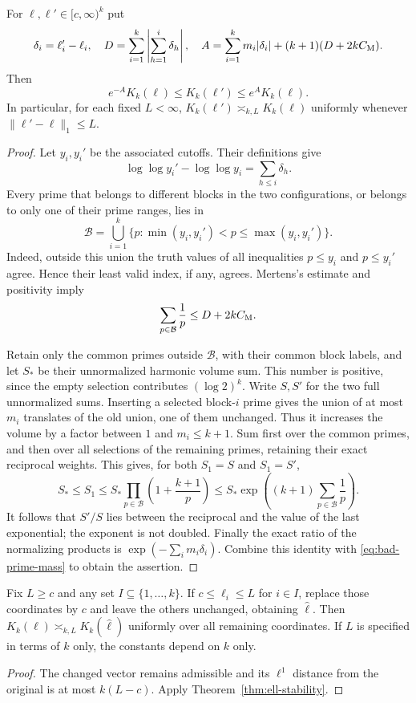 \begin{theorem}\label{thm:ell-stability}
For $\ell,\ell'\in[c,\infty)^k$ put
\[
 \delta_i=\ell'_i-\ell_i,\quad
 D=\sum_{i=1}^k\left|\sum_{h=1}^i\delta_h\right|,
 \quad
 A=\sum_{i=1}^km_i|\delta_i|+(k+1)(D+2kC_{\rm M}).
\]
Then
\[
 e^{-A}K_k(\ell)\le K_k(\ell')\le e^A K_k(\ell).
\]
In particular, for each fixed $L<\infty$,
$K_k(\ell')\asymp_{k,L}K_k(\ell)$ uniformly whenever
$\|\ell'-\ell\|_1\le L$.
\end{theorem}
\begin{proof}
Let $y_i,y_i'$ be the associated cutoffs. Their definitions give
\[
 \log\log y_i'-\log\log y_i=\sum_{h\le i}\delta_h.
\]
Every prime that belongs to different blocks in the two configurations,
or belongs to only one of their prime ranges, lies in
\[
 \mathcal B=\bigcup_{i=1}^k
  \{p:\min(y_i,y_i')<p\le\max(y_i,y_i')\}.
\]
Indeed, outside this union the truth values of all inequalities
$p\le y_i$ and $p\le y_i'$ agree. Hence their least valid index,
if any, agrees. Mertens's estimate and positivity imply
\begin{equation}\label{eq:bad-prime-mass}
 \sum_{p\in\mathcal B}\frac1p\le D+2kC_{\rm M}.
\end{equation}

Retain only the common primes outside $\mathcal B$, with their common
block labels, and let $S_*$ be their unnormalized harmonic volume sum.
This number is positive, since the empty selection contributes
$(\log2)^k$. Write $S,S'$ for the two full unnormalized sums.
Inserting a selected block-$i$ prime gives the union of at most $m_i$
translates of the old union, one of them unchanged. Thus it increases
the volume by a factor between $1$ and $m_i\le k+1$.
Sum first over the common primes, and then over all selections of
the remaining primes, retaining their exact reciprocal weights. This
gives, for both $S_1=S$ and $S_1=S'$,
\[
 S_*\le S_1\le
 S_*\prod_{p\in\mathcal B}\left(1+\frac{k+1}{p}\right)
 \le S_*\exp\left((k+1)\sum_{p\in\mathcal B}\frac1p\right).
\]
It follows that $S'/S$ lies between the reciprocal and the value of
the last exponential; the exponent is not doubled. Finally the exact
ratio of the normalizing products is
$\exp(-\sum_i m_i\delta_i)$. Combine this identity with
\eqref{eq:bad-prime-mass} to obtain the assertion.
\end{proof}

\begin{corollary}
\label{cor:bounded-blocks}
Fix $L\ge c$ and any set $I\subseteq\{1,\ldots,k\}$. If
$c\le\ell_i\le L$ for $i\in I$, replace those coordinates by $c$
and leave the others unchanged, obtaining $\widehat\ell$.
Then $K_k(\ell)\asymp_{k,L}K_k(\widehat\ell)$ uniformly over all
remaining coordinates. If $L$ is specified in terms of $k$ only, the
constants depend on $k$ only.
\end{corollary}
\begin{proof}
The changed vector remains admissible and its $\ell^1$ distance from
the original is at most $k(L-c)$. Apply
Theorem~\ref{thm:ell-stability}.
\end{proof}


